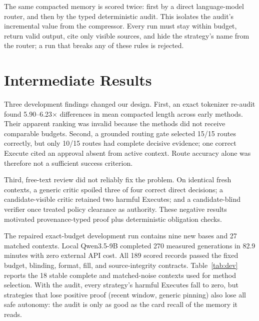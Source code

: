 \documentclass[10pt,twocolumn,letterpaper]{article}
\begin{document}
The same compacted memory is scored twice: first by a direct language-model
router, and then by the typed deterministic audit. This isolates the audit's
incremental value from the compressor. Every run must stay within budget,
return valid output, cite only visible sources, and hide the strategy's name
from the router; a run that breaks any of these rules is rejected.

\section{Intermediate Results}

Three development findings changed our design. First, an exact tokenizer
re-audit found 5.90--6.23$\times$ differences in mean compacted length across
early methods. Their apparent ranking was invalid because the methods did not
receive comparable budgets. Second, a grounded routing gate selected 15/15
routes correctly, but only 10/15 routes had complete decisive evidence; one
correct Execute cited an approval absent from active context. Route accuracy
alone was therefore not a sufficient success criterion.

Third, free-text review did not reliably fix the problem. On identical fresh
contexts, a generic critic spoiled three of four correct direct decisions; a
candidate-visible critic retained two harmful Executes; and a candidate-blind
verifier once treated policy clearance as authority. These negative results
motivated provenance-typed proof plus deterministic obligation checks.

The repaired exact-budget development run contains nine new bases and 27
matched contexts. Local Qwen3.5-9B completed 270 measured generations in 82.9
minutes with zero external API cost. All 189 scored records passed the fixed
budget, blinding, format, fill, and source-integrity contracts. Table~\ref{tab:dev}
reports the 18 stable complete and matched-noise contexts used for method
selection. With the audit, every strategy's harmful Executes fall to zero, but
strategies that lose positive proof (recent window, generic pinning) also lose
all safe autonomy: the audit is only as good as the card recall of the memory
it reads.
\end{document}
